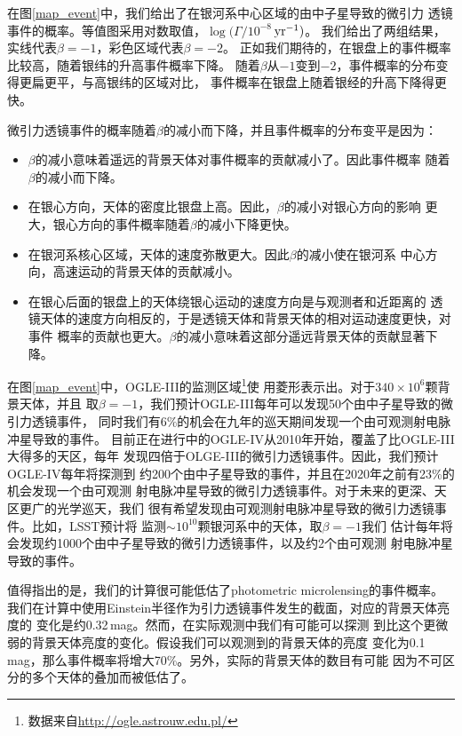 在图\ref{map_event}中，我们给出了在银河系中心区域的由中子星导致的微引力
透镜事件的概率。等值图采用对数取值，$\log(\Gamma/10^{-8}$\,$\rm{yr^{-1}})$。
我们给出了两组结果，实线代表$\beta=-1$，彩色区域代表$\beta=-2$。
正如我们期待的，在银盘上的事件概率比较高，随着银纬的升高事件概率下降。
随着$\beta$从$-1$变到$-2$，事件概率的分布变得更扁更平，与高银纬的区域对比，
事件概率在银盘上随着银经的升高下降得更快。

微引力透镜事件的概率随着$\beta$的减小而下降，并且事件概率的分布变平是因为：
\begin{itemize}
\item $\beta$的减小意味着遥远的背景天体对事件概率的贡献减小了。因此事件概率
随着$\beta$的减小而下降。
\item 在银心方向，天体的密度比银盘上高。因此，$\beta$的减小对银心方向的影响
更大，银心方向的事件概率随着$\beta$的减小下降更快。
\item 在银河系核心区域，天体的速度弥散更大。因此$\beta$的减小使在银河系
中心方向，高速运动的背景天体的贡献减小。
\item 在银心后面的银盘上的天体绕银心运动的速度方向是与观测者和近距离的
透镜天体的速度方向相反的，于是透镜天体和背景天体的相对运动速度更快，对事件
概率的贡献也更大。$\beta$的减小意味着这部分遥远背景天体的贡献显著下降。
\end{itemize}

在图\ref{map_event}中，OGLE-III的监测区域\footnote{数据来自\url{http://ogle.astrouw.edu.pl/}}使
用菱形表示出。对于$340\times10^6$颗背景天体\supercite{Szymanski}，并且
取$\beta=-1$，我们预计OGLE-III每年可以发现50个由中子星导致的微引力透镜事件，
同时我们有6\%的机会在九年的巡天期间发现一个由可观测射电脉冲星导致的事件。
目前正在进行中的OGLE-IV从2010年开始，覆盖了比OGLE-III大得多的天区，每年
发现四倍于OLGE-III的微引力透镜事件。因此，我们预计OGLE-IV每年将探测到
约200个由中子星导致的事件，并且在2020年之前有23\%的机会发现一个由可观测
射电脉冲星导致的微引力透镜事件。对于未来的更深、天区更广的光学巡天，我们
很有希望发现由可观测射电脉冲星导致的微引力透镜事件。比如，LSST预计将
监测$\sim10^{10}$颗银河系中的天体\supercite{ivez12a}，取$\beta=-1$我们
估计每年将会发现约1000个由中子星导致的微引力透镜事件，以及约2个由可观测
射电脉冲星导致的事件。

值得指出的是，我们的计算很可能低估了photometric microlensing的事件概率。
我们在计算中使用Einstein半径作为引力透镜事件发生的截面，对应的背景天体亮度的
变化是约0.32\,mag。然而，在实际观测中我们有可能可以探测
到比这个更微弱的背景天体亮度的变化。假设我们可以观测到的背景天体的亮度
变化为0.1\,mag，那么事件概率将增大70\%。另外，实际的背景天体的数目有可能
因为不可区分的多个天体的叠加而被低估了\supercite{Smith07}。
  
